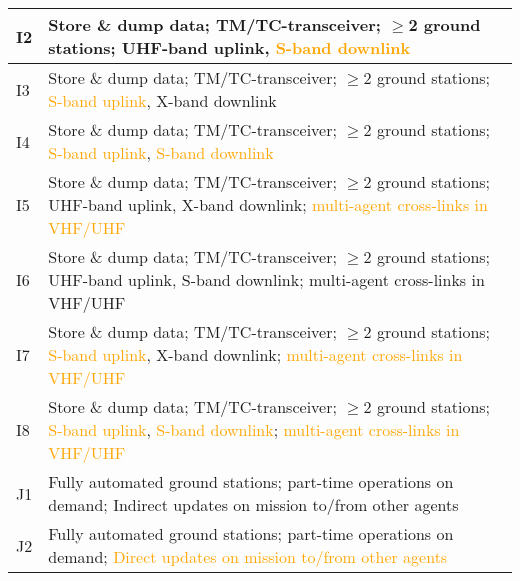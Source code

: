 \begin{table}[htbp]
\begin{tabular}{|p{0.8cm}|p{7cm}|}
			I2 & Store \& dump data; TM/TC-transceiver; $\geq$2 ground stations; UHF-band uplink, \textcolor{orange}{S-band downlink} \\ \hline
			I3 & Store \& dump data; TM/TC-transceiver; $\geq$2 ground stations; \textcolor{orange}{S-band uplink}, X-band downlink \\ \hline
			I4 & Store \& dump data; TM/TC-transceiver; $\geq$2 ground stations; \textcolor{orange}{S-band uplink}, \textcolor{orange}{S-band downlink} \\ \hline
			I5 & Store \& dump data; TM/TC-transceiver; $\geq$2 ground stations; UHF-band uplink, X-band downlink; \textcolor{orange}{multi-agent cross-links in VHF/UHF} \\ \hline
			I6 & Store \& dump data; TM/TC-transceiver; $\geq$2 ground stations; UHF-band uplink, S-band downlink; multi-agent cross-links in VHF/UHF \\ \hline
			I7 & Store \& dump data; TM/TC-transceiver; $\geq$2 ground stations; \textcolor{orange}{S-band uplink}, X-band downlink; \textcolor{orange}{multi-agent cross-links in VHF/UHF} \\ \hline
			I8 & Store \& dump data; TM/TC-transceiver; $\geq$2 ground stations; \textcolor{orange}{S-band uplink}, \textcolor{orange}{S-band downlink}; \textcolor{orange}{multi-agent cross-links in VHF/UHF} \\ \hline
			J1 & Fully automated ground stations; part-time operations on demand; Indirect updates on mission to/from other agents
\\ \hline
			J2 & Fully automated ground stations; part-time operations on demand; \textcolor{orange}{Direct updates on mission to/from other agents} \\ \hline
		\end{tabular}
\end{table}

